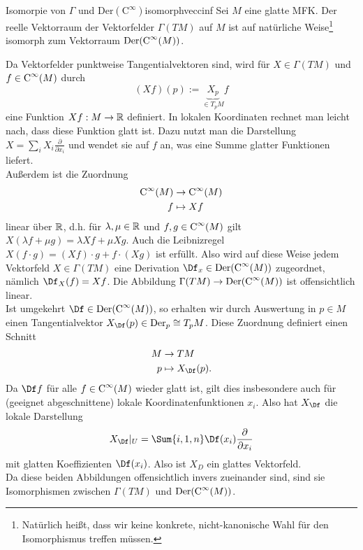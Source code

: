 \begin{satz}{Isomorpie von $\Gamma$ und $\text{Der} (\text{C}^\infty)$}{isomorphveccinf}
Sei $M$ eine glatte MFK. Der reelle Vektorraum der Vektorfelder $\Gamma (TM)$ auf $M$ ist auf natürliche Weise\footnote{Natürlich heißt, dass wir keine konkrete, nicht-kanonische Wahl für den Isomorphismus treffen müssen.} isomorph zum Vektorraum $\text{Der}(\cinf{M})$.
\end{satz}
\begin{beweis}
Da Vektorfelder punktweise Tangentialvektoren sind, wird für $X \in \Gamma (TM)$ und $f \in \cinf{M}$ durch
\begin{equation}
(Xf)(p):= \underbrace{X_p}_{\in T_pM} f
\end{equation}
eine Funktion $Xf: M \to \mathbb{R}$ definiert. In lokalen Koordinaten rechnet man leicht nach, dass diese Funktion glatt ist. Dazu nutzt man die Darstellung $X=\sum_i X_i \frac{\partial}{\partial x_i}$ und wendet sie auf $f$ an, was eine Summe glatter Funktionen liefert.\\
Außerdem ist die Zuordnung
\begin{align}
\cinf{M} &\to \cinf{M} \\
f &\mapsto Xf
\end{align}
linear über $\mathbb{R}$, d.h. für $\lambda, \mu \in \mathbb{R}$ und $f, g \in  \cinf{M}$ gilt $X(\lambda f + \mu g)=\lambda X f + \mu X g$. Auch die Leibnizregel $X(f \cdot g)= (Xf) \cdot g + f \cdot (Xg)$ ist erfüllt. Also wird auf diese Weise jedem Vektorfeld $X \in \Gamma (TM)$ eine Derivation $\Df_x \in \text{Der} (\cinf{M})$ zugeordnet, nämlich $\Df_X (f) = Xf$. Die Abbildung $\Gamma (TM) \to \text{Der} (\cinf{M})$ ist offensichtlich linear.\\
Ist umgekehrt $\Df \in \text{Der} (\cinf{M})$, so erhalten wir durch Auswertung in $p \in M$ einen Tangentialvektor $X_\Df (p) \in \der{p} \cong T_pM$. Diese Zuordnung definiert einen Schnitt
\begin{align}
M &\to TM \\
p &\mapsto X_\Df (p).
\end{align}
Da $\Df f$ für alle $f \in \cinf{M}$ wieder glatt ist, gilt dies insbesondere auch für (geeignet abgeschnittene) lokale Koordinatenfunktionen $x_i$. Also hat $X_\Df$ die lokale Darstellung
\begin{equation}
X_\Df |_U = \Sum{i,1,n} \Df (x_i) \frac{\partial}{\partial x_i}
\end{equation}
mit glatten Koeffizienten $\Df (x_i)$. Also ist $X_D$ ein glattes Vektorfeld.\\
Da diese beiden Abbildungen offensichtlich invers zueinander sind, sind sie Isomorphismen zwischen $\Gamma (TM)$ und $\text{Der} (\cinf{M})$.
\end{beweis}
